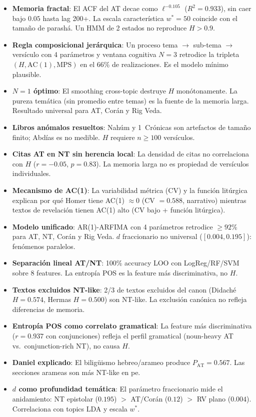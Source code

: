 \documentclass[12pt,a4paper]{article}
\begin{document}
\begin{itemize}[leftmargin=2em]
\item \textbf{Memoria fractal}: El ACF del AT decae como $\ell^{-0.105}$
      ($R^2 = 0.933$), sin caer bajo $0.05$ hasta lag 200+. La escala
      caracter\'istica $w^* = 50$ coincide con el tama\~no de parash\'a.
      Un HMM de 2 estados no reproduce $H > 0.9$.
\item \textbf{Regla composicional jer\'arquica}: Un proceso tema $\to$
      sub-tema $\to$ vers\'iculo con 4 par\'ametros y ventana cognitiva $N = 3$
      retrodice la tripleta $(H, \text{AC}(1), \text{MPS})$ en el 66\% de
      realizaciones. Es el modelo m\'inimo plausible.
\item \textbf{$N = 1$ \'optimo}: El smoothing cross-topic destruye $H$
      mon\'otonamente. La pureza tem\'atica (sin promedio entre temas) es
      la fuente de la memoria larga. Resultado universal para AT, Cor\'an
      y Rig Veda.
\item \textbf{Libros an\'omalos resueltos}: Nah\'um y 1~Cr\'onicas son
      artefactos de tama\~no finito; Abd\'ias es no medible.
      $H$ requiere $n \geq 100$ vers\'iculos.
\item \textbf{Citas AT en NT sin herencia local}: La densidad de citas
      no correlaciona con $H$ ($r = -0.05$, $p = 0.83$). La memoria
      larga no es propiedad de vers\'iculos individuales.
\item \textbf{Mecanismo de AC(1)}: La variabilidad m\'etrica (CV) y la
      funci\'on lit\'urgica explican por qu\'e Homer tiene AC(1) $\approx 0$
      (CV $= 0.588$, narrativo) mientras textos de revelaci\'on tienen
      AC(1) alto (CV bajo + funci\'on lit\'urgica).
\item \textbf{Modelo unificado}: AR(1)-ARFIMA con 4 par\'ametros retrodice
      $\geq 92$\% para AT, NT, Cor\'an y Rig Veda. $d$ fraccionario no universal
      ($[0.004, 0.195]$): fen\'omenos paralelos.
\item \textbf{Separaci\'on lineal AT/NT}: 100\% accuracy LOO con
      LogReg/RF/SVM sobre 8 features. La entrop\'ia POS es la feature
      m\'as discriminativa, no $H$.
\item \textbf{Textos excluidos NT-like}: 2/3 de textos excluidos del canon
      (Didach\'e $H = 0.574$, Hermas $H = 0.500$) son NT-like.
      La exclusi\'on can\'onica no refleja diferencias de memoria.
\item \textbf{Entrop\'ia POS como correlato gramatical}: La feature m\'as
      discriminativa ($r = 0.937$ con conjunciones) refleja el perfil gramatical
      (noun-heavy AT vs.\ conjunction-rich NT), no causa $H$.
\item \textbf{Daniel explicado}: El bilig\"uismo hebreo/arameo produce
      $P_{\text{AT}} = 0.567$. Las secciones arameas son m\'as NT-like en pe.
\item \textbf{$d$ como profundidad tem\'atica}: El par\'ametro fraccionario
      mide el anidamiento: NT epistolar ($0.195$) $>$ AT/Cor\'an ($0.12$)
      $>$ RV plano ($0.004$). Correlaciona con topics LDA y escala $w^*$.
\end{itemize}
\end{document}
